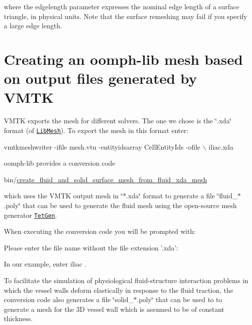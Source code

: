 where the edgelength parameter expresses the nominal edge length of a surface triangle, in physical units. Note that the surface remeshing may fail if you specify a large edge length.



 

 \hypertarget{index_oomph_mesh}{}\section{Creating an oomph-\/lib mesh based on output files generated by V\+M\+TK}\label{index_oomph_mesh}
V\+M\+TK exports the mesh for different solvers. The one we chose is the \char`\"{}.\+xda\char`\"{} format (of \href{http://libmesh.sourceforge.net/}{\tt Lib\+Mesh}). To export the mesh in this format enter\+:


\begin{DoxyCode}
 vmtkmeshwriter -ifile mesh.vtu -entityidsarray CellEntityIds -ofile \(\backslash\)
iliac.xda
\end{DoxyCode}


{\ttfamily oomph-\/lib} provides a conversion code 
\begin{DoxyCode}
bin/\hyperlink{create__fluid__and__solid__surface__mesh__from__fluid__xda__mesh_8cc_acaf73fcb31e5c25107e81bf28bb52d4c}{create\_fluid\_and\_solid\_surface\_mesh\_from\_fluid\_xda\_mesh}
\end{DoxyCode}


which uses the V\+M\+TK output mesh in \char`\"{}$\ast$.\+xda\char`\"{} format to generate a file \char`\"{}fluid\+\_\+$\ast$.\+poly\char`\"{} that can be used to generate the fluid mesh using the open-\/source mesh generator \href{http://wias-berlin.de/software/tetgen//}{\tt Tet\+Gen}.

When executing the conversion code you will be prompted with\+: 
\begin{DoxyCode}
Please enter the file name without the file extension \textcolor{stringliteral}{'.xda'}:
\end{DoxyCode}


In our example, enter {\ttfamily iliac} .

To facilitate the simulation of physiological fluid-\/structure interaction problems in which the vessel walls deform elastically in response to the fluid traction, the conversion code also generates a file \char`\"{}solid\+\_\+$\ast$.\+poly\char`\"{} that can be used to to generate a mesh for the 3D vessel wall which is assumed to be of constant thickness.

